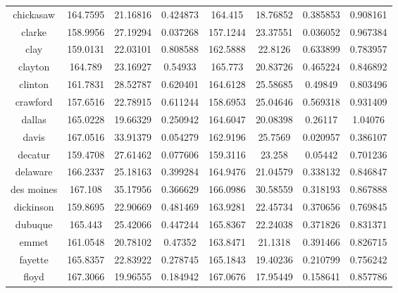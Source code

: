 \begin{table}[H]
\begin{tabular}{|c|ccc|ccc|c|}
chickasaw     & 164.7595 & 21.16816       & 0.424873 & 164.415  & 18.76852       & 0.385853 & 0.908161 \\
clarke        & 158.9956 & 27.19294       & 0.037268 & 157.1244 & 23.37551       & 0.036052 & 0.967384 \\
clay          & 159.0131 & 22.03101       & 0.808588 & 162.5888 & 22.8126        & 0.633899 & 0.783957 \\
clayton       & 164.789  & 23.16927       & 0.54933  & 165.773  & 20.83726       & 0.465224 & 0.846892 \\
clinton       & 161.7831 & 28.52787       & 0.620401 & 164.6128 & 25.58685       & 0.49849  & 0.803496 \\
crawford      & 157.6516 & 22.78915       & 0.611244 & 158.6953 & 25.04646       & 0.569318 & 0.931409 \\
dallas        & 165.0228 & 19.66329       & 0.250942 & 164.6047 & 20.08398       & 0.26117  & 1.04076  \\
davis         & 167.0516 & 33.91379       & 0.054279 & 162.9196 & 25.7569        & 0.020957 & 0.386107 \\
decatur       & 159.4708 & 27.61462       & 0.077606 & 159.3116 & 23.258         & 0.05442  & 0.701236 \\
delaware      & 166.2337 & 25.18163       & 0.399284 & 164.9476 & 21.04579       & 0.338132 & 0.846847 \\
des moines    & 167.108  & 35.17956       & 0.366629 & 166.0986 & 30.58559       & 0.318193 & 0.867888 \\
dickinson     & 159.8695 & 22.90669       & 0.481469 & 163.9281 & 22.45734       & 0.370656 & 0.769845 \\
dubuque       & 165.443  & 25.42066       & 0.447244 & 165.8367 & 22.24038       & 0.371826 & 0.831371 \\
emmet         & 161.0548 & 20.78102       & 0.47352  & 163.8471 & 21.1318        & 0.391466 & 0.826715 \\
fayette       & 165.8357 & 22.83922       & 0.278745 & 165.1843 & 19.40236       & 0.210799 & 0.756242 \\
floyd         & 167.3066 & 19.96555       & 0.184942 & 167.0676 & 17.95449       & 0.158641 & 0.857786 \\
\hline
\end{tabular}
\end{table}


